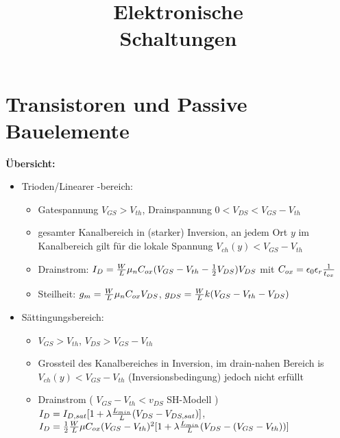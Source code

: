 \documentclass[european]{latex4ei_sheet}
\title{Elektronische \\ Schaltungen}
\begin{document}
\ifdefined\GitRevision{}\fi

\maketitle   %

\section{Transistoren und Passive Bauelemente}


\begin{sectionbox}
    \textbf{\"Ubersicht:}
    \begin{itemize}
        \item Trioden/Linearer -bereich:
            \begin{itemize}
                \item Gatespannung $ V_{GS} > V_ {th} $, Drainspannung $ 0 < V_{DS} < V_{GS} - V_{th} $
                \item gesamter Kanalbereich in (starker) Inversion,
                    an jedem Ort $ y $ im Kanalbereich gilt für die lokale Spannung $ V_{ch}(y) < V_{GS} - V_{th} $
                \item Drainstrom: $ I_D = {W \over L} \mu_n C_{ox} (V_{GS} - V_{th} - {1 \over 2} V_{DS}) V_{DS} $ mit $ C_{ox} = \epsilon_0 \epsilon_r {1 \over t_{ox}} $
                \item Steilheit: $ g_m = {W \over L} \mu_n C_{ox} V_{DS} $, $ g_{DS} = {W \over L} k (V_{GS} - V_{th} - V_{DS}) $
            \end{itemize}
        \item Sättingungsbereich:
            \begin{itemize}
                \item $ V_{GS} > V_{th} $, $ V_{DS} > V_{GS} - V_{th} $ 
                \item Grossteil des Kanalbereiches in Inversion, im drain-nahen Bereich is $ V_{ch}(y) < V_{GS} - V_{th} $ (Inversionsbedingung) jedoch nicht erfüllt
                \item Drainstrom ( $ V_{GS} - V_{th} < v_{DS} $ SH-Modell )
                    $ I_D = I_{D,sat} [1+\lambda {L_{min} \over L} (V_{DS}- V_{DS,sat})] $, $ I_D = {1 \over 2}{W \over L} \mu C_{ox} (V_{GS} - V_{th})^2 [1+\lambda {L_{min} \over L} (V_{DS} - (V_{GS} - V_{th}))] $ 

\end{itemize}
\end{itemize}
\end{sectionbox}
\end{document}
